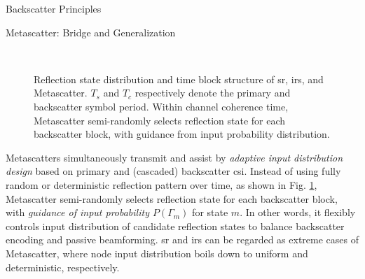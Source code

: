 \documentclass[journal]{IEEEtran}
\begin{document}
\begin{section}{Backscatter Principles}
	\begin{subsection}{Metascatter: Bridge and Generalization}
		\begin{figure}[!t]
			\centering
			\\
			\caption{
				Reflection state distribution and time block structure of \gls{sr}, \gls{irs}, and Metascatter.
				$T_s$ and $T_c$ respectively denote the primary and backscatter symbol period.
				Within channel coherence time, Metascatter semi-randomly selects reflection state for each backscatter block, with guidance from input probability distribution.
			}
			\label{fi:metascatter}
		\end{figure}
		Metascatters simultaneously transmit and assist by \emph{adaptive input distribution design} based on primary and (cascaded) backscatter \gls{csi}.
		Instead of using fully random or deterministic reflection pattern over time, as shown in Fig. \ref{fi:metascatter}, Metascatter semi-randomly selects reflection state for each backscatter block, with \emph{guidance of input probability $P(\Gamma_m)$} for state $m$. In other words, it flexibly controls input distribution of candidate reflection states to balance backscatter encoding and passive beamforming. \gls{sr} and \gls{irs} can be regarded as extreme cases of Metascatter, where node input distribution boils down to uniform and deterministic, respectively.

\end{subsection}
\end{section}
\end{document}
